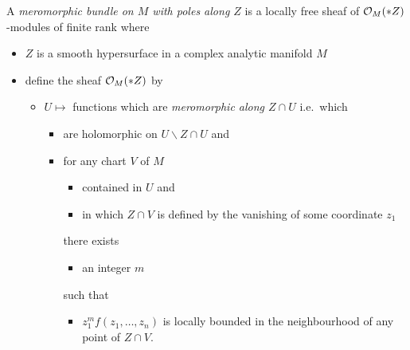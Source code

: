 \begin{defn}
  A \emph{meromorphic bundle on $M$ with poles along $Z$} is a locally free
  sheaf of $\mathcal{O}_M(*Z)$-modules of finite rank
  where
  \begin{itemize}
    \item $Z$ is a smooth hypersurface in a complex analytic manifold $M$
    \item define the sheaf $\mathcal{O}_M(*Z)$ by
      \begin{itemize}
        \item $U\mapsto$ functions which are \emph{meromorphic along $Z\cap U$}
          i.e.\ which
          \begin{itemize}
            \item are holomorphic on $U\backslash Z\cap U$ and
            \item for any chart $V$ of $M$
              \begin{itemize}
                \item contained in $U$ and
                \item in which $Z\cap V$ is defined by the vanishing of some
                  coordinate $z_1$
              \end{itemize}
              there exists
              \begin{itemize}
                \item an integer $m$
              \end{itemize}
              such that
              \begin{itemize}
                \item $z_1^mf(z_1,\dots,z_n)$ is locally bounded in the
                  neighbourhood of any point of $Z\cap V$.
              \end{itemize}
          \end{itemize}
      \end{itemize}
  \end{itemize}
\end{defn}

